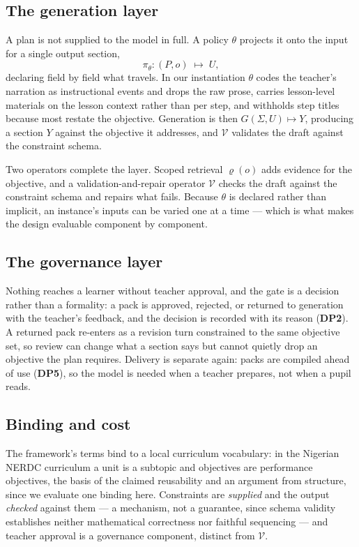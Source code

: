 \documentclass{article}
\begin{document}
\subsection{The generation layer}
\label{sec:repr}

A plan is not supplied to the model in full. A policy $\theta$ projects it onto the input for a
single output section,
\begin{equation}
\pi_\theta : (P,o) \;\longmapsto\; U ,
\label{eq:proj}
\end{equation}
declaring field by field what travels. In our instantiation $\theta$ codes the teacher's
narration as instructional events and drops the raw prose, carries lesson-level materials on the
lesson context rather than per step, and withholds step titles because most restate the
objective. Generation is then $G(\Sigma,U)\mapsto Y$, producing a section $Y$ against the
objective it addresses, and $\mathcal{V}$ validates the draft against the constraint schema.

Two operators complete the layer. Scoped retrieval $\varrho(o)$ adds evidence for the
objective, and a validation-and-repair operator $\mathcal{V}$ checks the draft against the
constraint schema and repairs what fails. Because $\theta$ is declared rather than implicit, an
instance's inputs can be varied one at a time --- which is what makes the design evaluable
component by component.

\subsection{The governance layer}

Nothing reaches a learner without teacher approval, and the gate is a decision rather than a
formality: a pack is approved, rejected, or returned to generation with the teacher's feedback,
and the decision is recorded with its reason (\textbf{DP2}). A returned pack re-enters as a
revision turn constrained to the same objective set, so review can change what a section says
but cannot quietly drop an objective the plan requires. Delivery is separate again: packs are
compiled ahead of use (\textbf{DP5}), so the model is needed when a teacher prepares, not when
a pupil reads.

\subsection{Binding and cost}

The framework's terms bind to a local curriculum vocabulary: in the Nigerian NERDC curriculum a
unit is a subtopic and objectives are performance objectives, the basis of the claimed
reusability and an argument from structure, since we evaluate one binding here. Constraints are
\emph{supplied} and the output \emph{checked} against them --- a mechanism, not a guarantee,
since schema validity establishes neither mathematical correctness nor faithful sequencing ---
and teacher approval is a governance component, distinct from $\mathcal{V}$.
\end{document}
